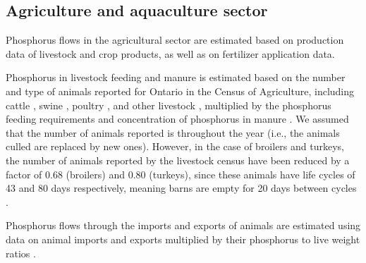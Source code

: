 \documentclass[authoryear]{elsarticle}
\begin{document}
\subsection{Agriculture and aquaculture sector} \label{section:AgriSector}
Phosphorus flows in the agricultural sector are estimated based on production data of livestock and crop products, as well as on fertilizer application data.

Phosphorus in livestock feeding and manure
is estimated based on the number and type of animals reported for Ontario
in the Census of Agriculture, including cattle \citep{LivestockCensusCattle}, swine \citep{LivestockCensusPig}, poultry \citep{LivestockCensusPoultry}, and other livestock \citep{LivestockCensusSheep, LivestockCensusOtherLivestock},
multiplied by the phosphorus feeding requirements and concentration of phosphorus in manure \citep{NetherlandsCompositions,BrownCompositions, VanStaden2021}.
We assumed that the number of animals reported is throughout the year (i.e., the animals culled are replaced by new ones). However, in the case of broilers and turkeys, the number of animals reported by the livestock census have been reduced by a factor of 0.68 (broilers) and 0.80 (turkeys), since these animals have life cycles of 43 and 80 days respectively, meaning barns are empty for 20 days between cycles \citep{yang2007development}.

Phosphorus flows through the imports and exports of animals are estimated using data on animal imports and exports \citep{CattleImportsExports, HogsImportsExports, SheepImportsExports} multiplied by their phosphorus to live weight ratios \citep{NetherlandsCompositions}.
\end{document}
